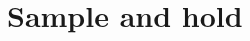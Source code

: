 \documentclass[../../ASSD_TP1_G7.tex]{subfiles}
\begin{document}
\chapter*{Sample and hold}
\end{document}
